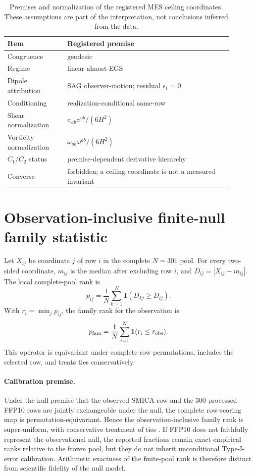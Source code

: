\documentclass[11pt]{article}
\begin{document}
\begin{table}[ht]
\centering
\small
\caption{Premises and normalization of the registered MES ceiling coordinates. These assumptions are part of the interpretation, not conclusions inferred from the data.}
\begin{tabular}{p{0.24\linewidth}p{0.66\linewidth}}
\toprule
Item & Registered premise \\
\midrule
Congruence & geodesic \\
Regime & linear almost-EGS \\
Dipole attribution & SAG observer-motion; residual $\epsilon_1=0$ \\
Conditioning & realization-conditional same-row \\
Shear normalization & $\sigma_{ab}\sigma^{ab}/(6H^2)$ \\
Vorticity normalization & $\omega_{ab}\omega^{ab}/(6H^2)$ \\
$C_1/C_2$ status & premise-dependent derivative hierarchy \\
Converse & forbidden; a ceiling coordinate is not a measured invariant \\
\bottomrule
\end{tabular}
\label{tab:mes-premises}
\end{table}

\section{Observation-inclusive finite-null family statistic}
Let $X_{ij}$ be coordinate $j$ of row $i$ in the complete $N=301$ pool. For every two-sided coordinate, $m_{ij}$ is the median after excluding row $i$, and $D_{ij}=|X_{ij}-m_{ij}|$. The local complete-pool rank is
\[
p_{ij}=\frac1N\sum_{k=1}^N\mathbf 1(D_{kj}\ge D_{ij}).
\]
With $r_i=\min_j p_{ij}$, the family rank for the observation is
\[
p_{\rm fam}=\frac1N\sum_{i=1}^N\mathbf 1(r_i\le r_{\rm obs}).
\]
This operator is equivariant under complete-row permutations, includes the selected row, and treats ties conservatively.

\paragraph{Calibration premise.}
Under the null premise that the observed SMICA row and the 300 processed FFP10 rows are jointly exchangeable under the null, the complete row-scoring map is permutation-equivariant. Hence the observation-inclusive family rank is super-uniform, with conservative treatment of ties \cite{PhipsonSmyth2010,BarberRamdas2026}. If FFP10 does not faithfully represent the observational null, the reported fractions remain exact empirical ranks relative to the frozen pool, but they do not inherit unconditional Type-I-error calibration. Arithmetic exactness of the finite-pool rank is therefore distinct from scientific fidelity of the null model.
\end{document}
